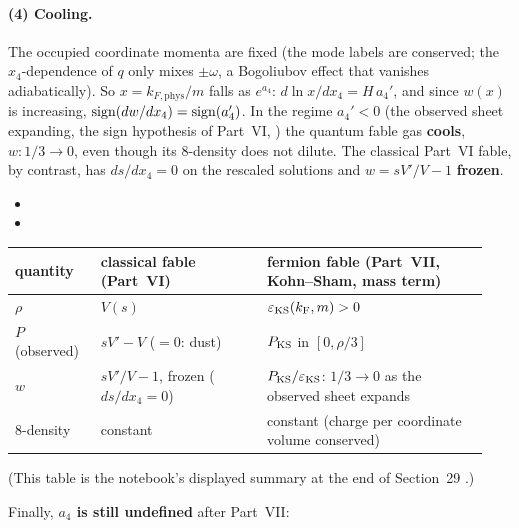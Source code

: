 \paragraph{(4) Cooling.} The occupied coordinate momenta are fixed (the mode labels are conserved;
the $x_4$-dependence of $q$ only mixes $\pm\omega$, a Bogoliubov effect that vanishes adiabatically).
So $x=k_{F,\mathrm{phys}}/m$ falls as $e^{a_4}$: $d\ln x/dx_4=H\,a_4'$, and since $w(x)$ is increasing,
$\operatorname{sign}(dw/dx_4)=\operatorname{sign}(a_4')$. In the regime $a_4'<0$ (the observed sheet expanding, the sign
hypothesis of Part~VI, ) the quantum fable gas \textbf{cools}, $w:1/3\to0$, even
though its 8-density does not dilute. The classical Part~VI fable, by contrast, has $ds/dx_4=0$ on the
rescaled solutions and $w=sV'/V-1$ \textbf{frozen}. 
\begin{itemize}
  \item {}
  \item {}
\end{itemize}

{\small
\begin{longtable}{@{}p{0.17\linewidth}p{0.33\linewidth}p{0.44\linewidth}@{}}
\toprule
\raggedright quantity & \raggedright classical fable (Part~VI) & \raggedright fermion fable (Part~VII, Kohn--Sham, mass term) \tabularnewline
\midrule
\endhead
\raggedright $\rho$ & \raggedright $V(s)$ & \raggedright $\varepsilon_{\mathrm{KS}}(k_{\mathrm{F}},m)>0$ \tabularnewline
\raggedright $P$ (observed) & \raggedright $sV'-V$ ($=0$: dust) & \raggedright $P_{\mathrm{KS}}$ in $[0,\rho/3]$ \tabularnewline
\raggedright $w$ & \raggedright $sV'/V-1$, frozen ($ds/dx_4=0$) & \raggedright $P_{\mathrm{KS}}/\varepsilon_{\mathrm{KS}}$: $1/3\to0$ as the observed sheet expands \tabularnewline
\raggedright 8-density & \raggedright constant & \raggedright constant (charge per coordinate volume conserved) \tabularnewline
\bottomrule
\end{longtable}
}
\noindent(This table is the notebook's displayed summary at the end of Section~29 .)

Finally, \textbf{$a_4$ is still undefined} after Part~VII: 


